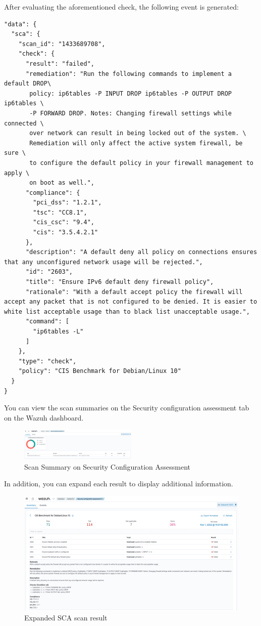After evaluating the aforementioned check, the following event is generated:
\begin{verbatim}
"data": {
  "sca": {
    "scan_id": "1433689708",
    "check": {
      "result": "failed",
      "remediation": "Run the following commands to implement a default DROP\
       policy: ip6tables -P INPUT DROP ip6tables -P OUTPUT DROP ip6tables \
       -P FORWARD DROP. Notes: Changing firewall settings while connected \
       over network can result in being locked out of the system. \
       Remediation will only affect the active system firewall, be sure \
       to configure the default policy in your firewall management to apply \
       on boot as well.",
      "compliance": {
        "pci_dss": "1.2.1",
        "tsc": "CC8.1",
        "cis_csc": "9.4",
        "cis": "3.5.4.2.1"
      },
      "description": "A default deny all policy on connections ensures that any unconfigured network usage will be rejected.",
      "id": "2603",
      "title": "Ensure IPv6 default deny firewall policy",
      "rationale": "With a default accept policy the firewall will accept any packet that is not configured to be denied. It is easier to white list acceptable usage than to black list unacceptable usage.",
      "command": [
        "ip6tables -L"
      ]
    },
    "type": "check",
    "policy": "CIS Benchmark for Debian/Linux 10"
  }
}
\end{verbatim}
You can view the scan summaries on the Security configuration assessment tab on the Wazuh dashboard.
\begin{figure} [H]
    \centering
    \includegraphics[width=0.5\textwidth]{images/sca/sca-12.png}
    \caption{Scan Summary on Security Configuration Assessment}
    \label{fig:sca-12}
\end{figure}

In addition, you can expand each result to display additional information.
\begin{figure} [H]
    \centering
    \includegraphics[width=\textwidth]{images/sca/sca-13.png}
    \caption{Expanded SCA scan result}
    \label{fig:sca-13}
\end{figure}

